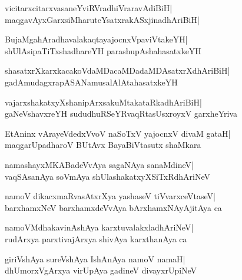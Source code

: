 \documentclass[twoside,12pt,openright]{book}
\newcounter{shloka}[chapter]
\begin{document}
\begin{shloka}%
vicitarxcitarxvasaneYviRVradhiVraravAdiBiH|\\
maqgavAyxGarxsiMharuteYsatxrakASxjinadhAriBiH|
\end{shloka}


\begin{shloka}%
BujaMgahAradhavalakaqtayajocnxVpaviVtakeYH|\\
shUlAsipaTiTxshadhareYH parashupAshahasatxkeYH
\end{shloka}

\begin{shloka}%
shasatxrXkarxkacakoVdaMDacaMDadaMDAsatxrXdhAriBiH|\\
gadAmudagxrapASANamusalAlAtahasatxkeYH
\end{shloka}

\begin{shloka}%
vajarxshakatxyXshanipArxsakuMtakataRkadhAriBiH|\\
gaNeVshavxreYH sududhuRSeYRvaqRtasUsxroyxV garxheYriva
\end{shloka}

\begin{shloka}%
EtAninx vArayeVdedxVvoV naSoTxV yajocnxV divaM gataH|\\
maqgarUpadharoV BUtAvx BayaBiVtasutx shaMkara
\end{shloka}

\begin{shloka}%
namashayxMKABadeVvAya sagaNAya sanaMdineV|\\
vaqSAsanAya soVmAya shUlashakatxyXSiTxRdhAriNeV
\end{shloka}

\begin{shloka}%
namoV dikacxmaRvasAtxrXya yashaseV tiVvarxceVtaseV|\\
barxhamxNeV barxhamxdeVvAya bArxhamxNAyAjitAya ca
\end{shloka}

\begin{shloka}%
namoVMdhakavinAshAya karxtuvalakxladhAriNeV|\\
rudArxya parxtivajArxya shivAya karxthanAya ca
\end{shloka}

\begin{shloka}%
giriVshAya sureVshAya IshAnAya namoV namaH|\\
dhUmorxVgArxya virUpAya gadineV divayxrUpiNeV
\end{shloka}
\end{document}
